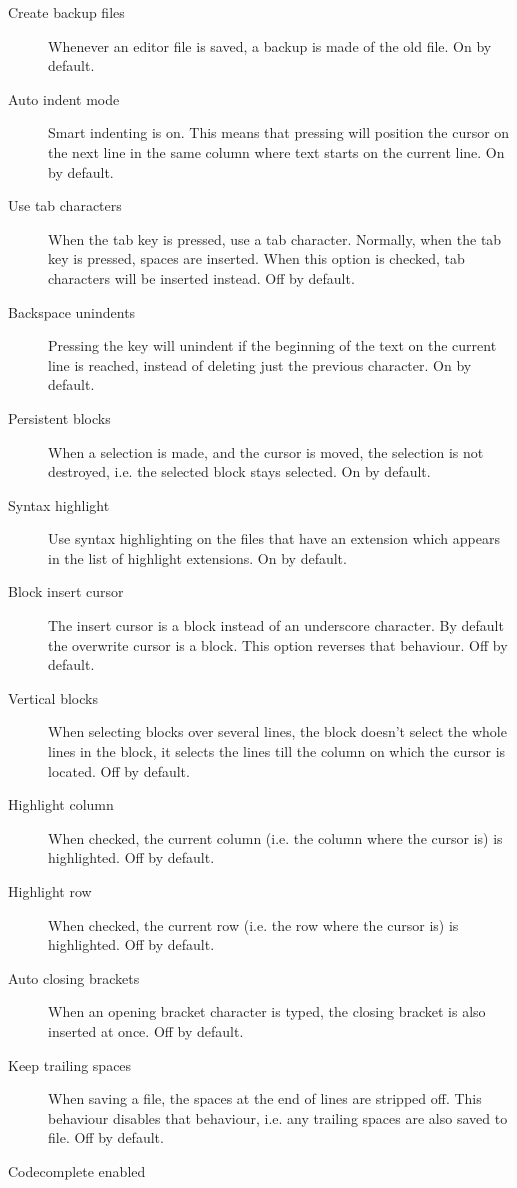 \begin{description}
\item[Create backup files]
Whenever an editor file is saved, a backup is made of the old file. On by
default.
\item[Auto indent mode] 
Smart indenting is on. This means that pressing  will position the 
cursor on the next line in the same column where text starts on the current
line. On by default.
\item[Use tab characters] 
When the tab key is pressed, use a tab character. Normally, when the tab key
is pressed, spaces are inserted. When this option is checked, tab characters 
will be inserted instead. Off by default.
\item[Backspace unindents]
Pressing the  key will unindent if the beginning of the text on
the current line is reached, instead of deleting just the previous
character. On by default.
\item[Persistent blocks]
When a selection is made, and the cursor is moved, the selection is not
destroyed, i.e. the selected block stays selected. On by default. 
\item[Syntax highlight]
Use syntax highlighting on the files that have an extension which appears in
the list of highlight extensions. On by default.
\item[Block insert cursor]
The insert cursor is a block instead of an underscore character. By default
the overwrite cursor is a block. This option reverses that behaviour. Off by
default.
\item[Vertical blocks]
When selecting blocks over several lines, the block doesn't select the whole
lines in the block, it selects the lines till the column on which the cursor
is located. Off by default.
\item[Highlight column]
When checked, the current column (i.e. the column where the cursor is) is
highlighted. Off by default.
\item[Highlight row]
When checked, the current row (i.e. the row where the cursor is) is
highlighted. Off by default.
\item[Auto closing brackets]
When an opening bracket character is typed, the closing bracket is also
inserted at once. Off by default.
\item[Keep trailing spaces]
When saving a file, the spaces at the end of lines are stripped off. This
behaviour disables that behaviour, i.e. any trailing spaces are also saved
to file. Off by default.
\item[Codecomplete enabled]

\end{description}
